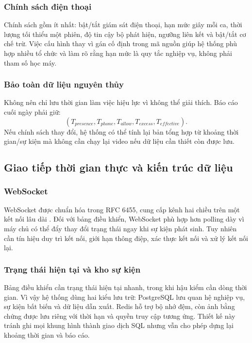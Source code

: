 \subsubsection{Chính sách điện thoại}
Chính sách gồm ít nhất: bật/tắt giám sát điện thoại, hạn mức giây mỗi ca, thời lượng tối thiểu một phiên, độ tin cậy bộ phát hiện, ngưỡng liên kết và bật/tắt cơ chế trừ. Việc cấu hình thay vì gán cố định trong mã nguồn giúp hệ thống phù hợp nhiều tổ chức và làm rõ rằng hạn mức là quy tắc nghiệp vụ, không phải tham số học máy.

\subsubsection{Bảo toàn dữ liệu nguyên thủy}
Không nên chỉ lưu thời gian làm việc hiệu lực vì không thể giải thích. Báo cáo cuối ngày phải giữ:
\begin{equation}
 (T_{presence},T_{phone},T_{allow},T_{excess},T_{effective}).
\end{equation}
Nếu chính sách thay đổi, hệ thống có thể tính lại bản tổng hợp từ khoảng thời gian/sự kiện mà không cần chạy lại video nếu dữ liệu cần thiết còn được lưu.

\subsection{Giao tiếp thời gian thực và kiến trúc dữ liệu}
\subsubsection{WebSocket}
WebSocket được chuẩn hóa trong RFC 6455, cung cấp kênh hai chiều trên một kết nối lâu dài \cite{rfc6455}. Đối với bảng điều khiển, WebSocket phù hợp hơn polling dày vì máy chủ có thể đẩy thay đổi trạng thái ngay khi sự kiện phát sinh. Tuy nhiên cần tín hiệu duy trì kết nối, giới hạn thông điệp, xác thực kết nối và xử lý kết nối lại.

\subsubsection{Trạng thái hiện tại và kho sự kiện}
Bảng điều khiển cần trạng thái hiện tại nhanh, trong khi hậu kiểm cần dòng thời gian. Vì vậy hệ thống dùng hai kiểu lưu trữ: PostgreSQL lưu quan hệ nghiệp vụ, sự kiện bất biến và dữ liệu dẫn xuất. Redis hỗ trợ bộ nhớ đệm, còn ảnh bằng chứng được lưu riêng với thời hạn và quyền truy cập tương ứng. Thiết kế này tránh ghi mọi khung hình thành giao dịch SQL nhưng vẫn cho phép dựng lại khoảng thời gian và báo cáo.

